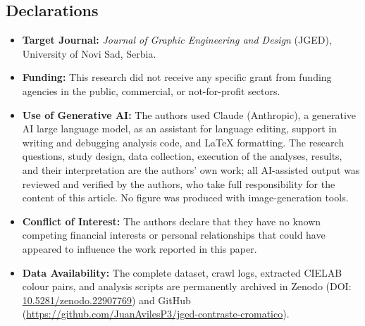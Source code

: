 \documentclass[11pt]{article}
\begin{document}
\subsection*{Declarations}
\begin{itemize}\setlength{\itemsep}{0.3em}
\item \textbf{Target Journal:} \textit{Journal of Graphic Engineering and Design} (JGED), University of Novi Sad, Serbia.
\item \textbf{Funding:} This research did not receive any specific grant from funding agencies in the public, commercial, or not-for-profit sectors.
\item \textbf{Use of Generative AI:} The authors used Claude (Anthropic), a generative AI large language model, as an assistant for language editing, support in writing and debugging analysis code, and LaTeX formatting. The research questions, study design, data collection, execution of the analyses, results, and their interpretation are the authors' own work; all AI-assisted output was reviewed and verified by the authors, who take full responsibility for the content of this article. No figure was produced with image-generation tools.
\item \textbf{Conflict of Interest:} The authors declare that they have no known competing financial interests or personal relationships that could have appeared to influence the work reported in this paper.
\item \textbf{Data Availability:} The complete dataset, crawl logs, extracted CIELAB colour pairs, and analysis scripts are permanently archived in Zenodo (DOI: \href{https://doi.org/10.5281/zenodo.22907769}{10.5281/zenodo.22907769}) and GitHub (\url{https://github.com/JuanAvilesP3/jged-contraste-cromatico}).
\end{itemize}
\end{document}
